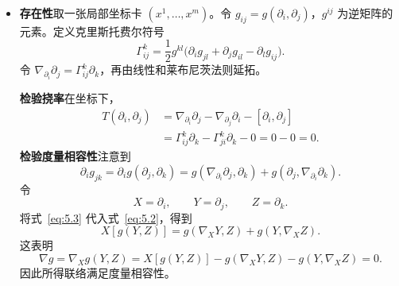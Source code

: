 \begin{itemize}
  \item \textbf{存在性}\quad 取一张局部坐标卡 $(x^1,\ldots,x^m)$。令 $g_{ij}=g(\partial_i,\partial_j)$，$g^{ij}$ 为逆矩阵的元素。定义克里斯托费尔符号
  \[
    \Gamma^k_{ij}=\frac12 g^{kl}
       \bigl(\partial_i g_{jl}+\partial_j g_{il}-\partial_l g_{ij}\bigr).
  \]
  令 $\nabla_{\partial_i}\partial_j=\Gamma^k_{ij}\partial_k$，再由线性和莱布尼茨法则延拓。

  \textbf{检验挠率}\quad 在坐标下，
  \[
    \begin{aligned}
      T(\partial_i,\partial_j)
       &=\nabla_{\partial_i}\partial_j-\nabla_{\partial_j}\partial_i
         -[\partial_i,\partial_j]\\
       &=\Gamma^k_{ij}\partial_k-\Gamma^k_{ji}\partial_k-0
         =0-0=0.
    \end{aligned}
  \]
  \textbf{检验度量相容性}\quad 注意到
  \begin{equation*}
    \partial_i g_{jk}=\partial_i g(\partial_j,\partial_k)
       =g(\nabla_{\partial_i}\partial_j,\partial_k)
        +g(\partial_j,\nabla_{\partial_i}\partial_k).
    \tag{5.2}\label{eq:5.2}
  \end{equation*}
  令
  \begin{equation*}
    X=\partial_i,\qquad Y=\partial_j,\qquad Z=\partial_k.
    \tag{5.3}\label{eq:5.3}
  \end{equation*}
  将式~\eqref{eq:5.3} 代入式~\eqref{eq:5.2}，得到
  \begin{equation*}
    X[g(Y,Z)]=g(\nabla_XY,Z)+g(Y,\nabla_XZ).
    \tag{5.4}\label{eq:5.4}
  \end{equation*}
  这表明
  \[
    \nabla g=\nabla_Xg(Y,Z)
       =X[g(Y,Z)]-g(\nabla_XY,Z)-g(Y,\nabla_XZ)=0.
  \]
  因此所得联络满足度量相容性。
\end{itemize}

